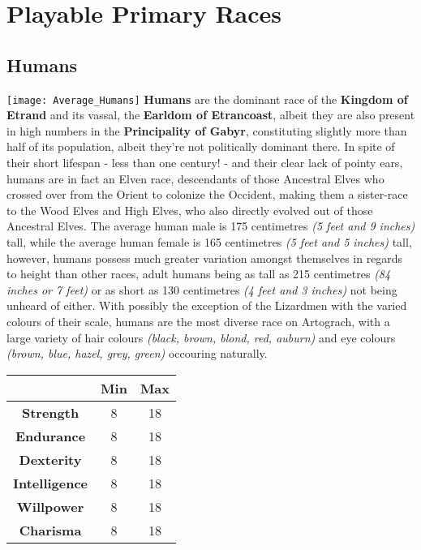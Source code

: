 \documentclass[openany,10pt,a4paper]{book}
\begin{document}
\chapter{Playable Primary Races}
\section{Humans}
\texttt{[image: Average\_Humans]}\newline
\textbf{Humans} are the dominant race of the \textbf{Kingdom of Etrand} and its vassal, the \textbf{Earldom of Etrancoast}, albeit they are also present in high numbers in the \textbf{Principality of Gabyr}, constituting slightly more than half of its population, albeit they're not politically dominant there. In spite of their short lifespan - less than one century! - and their clear lack of pointy ears, humans are in fact an Elven race, descendants of those Ancestral Elves who crossed over from the Orient to colonize the Occident, making them a sister-race to the Wood Elves and High Elves, who also directly evolved out of those Ancestral Elves.\newline
The average human male is 175 centimetres \textit{(5 feet and 9 inches)} tall, while the average human female is 165 centimetres \textit{(5 feet and 5 inches)} tall, however, humans possess much greater variation amongst themselves in regards to height than other races, adult humans being as tall as 215 centimetres \textit{(84 inches or 7 feet)} or as short as 130 centimetres \textit{(4 feet and 3 inches)} not being unheard of either. With possibly the exception of the Lizardmen with the varied colours of their scale, humans are the most diverse race on Artograch, with a large variety of hair colours \textit{(black, brown, blond, red, auburn)} and eye colours \textit{(brown, blue, hazel, grey, green)} occouring naturally.\newline
\begin{tabular}{|c|c|c|}
\hline
 & \textbf{Min} & \textbf{Max} \\ \hline
\textbf{Strength} & 8 & 18 \\ \hline
\textbf{Endurance} & 8 & 18 \\ \hline
\textbf{Dexterity} & 8 & 18 \\ \hline
\textbf{Intelligence} & 8 & 18 \\ \hline
\textbf{Willpower} & 8 & 18 \\ \hline
\textbf{Charisma} & 8 & 18 \\ \hline
\end{tabular}\newline
{} \newpage
\end{document}
